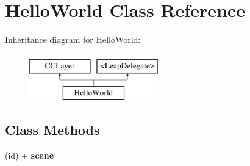 \hypertarget{interface_hello_world}{\section{Hello\-World Class Reference}
\label{dd/d0c/interface_hello_world}
}
Inheritance diagram for Hello\-World\-:\begin{figure}[H]
\begin{center}
\leavevmode
\includegraphics[height=2.000000cm]{dd/d0c/interface_hello_world}
\end{center}
\end{figure}
\subsection*{Class Methods}
\begin{DoxyCompactItemize}
\item 
\hypertarget{interface_hello_world_ad4a0819f2a6b47bd9332afe9d6007074}{(id) + {\bfseries scene}}\label{dd/d0c/interface_hello_world_ad4a0819f2a6b47bd9332afe9d6007074}

\end{DoxyCompactItemize}
